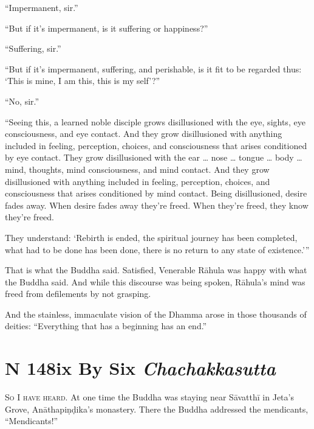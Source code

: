 \documentclass[12pt,openany]{book}%
\newcommand*{\suttatitleacronym}[1]{\smaller[2]{#1}\vspace*{.3em}}
\newcommand*{\suttatitletranslation}[1]{\linebreak{#1}}
\newcommand*{\suttatitleroot}[1]{\linebreak\smaller[2]\itshape{#1}}
\newcommand*{\tocacronym}[1]{\hspace*{-3.3em}{#1}\quad}
\newcommand*{\toctranslation}[1]{#1}
\newcommand*{\tocroot}[1]{(\textit{#1})}
\newcommand*{\scevam}[1]{\textsc{#1}}
\begin{document}
“Impermanent, sir.” 

“But if it’s impermanent, is it suffering or happiness?” 

“Suffering, sir.” 

“But if it’s impermanent, suffering, and perishable, is it fit to be regarded thus: ‘This is mine, I am this, this is my self’?” 

“No, sir.” 

“Seeing this, a learned noble disciple grows disillusioned with the eye, sights, eye consciousness, and eye contact. And they grow disillusioned with anything included in feeling, perception, choices, and consciousness that arises conditioned by eye contact. They grow disillusioned with the ear … nose … tongue … body … mind, thoughts, mind consciousness, and mind contact. And they grow disillusioned with anything included in feeling, perception, choices, and consciousness that arises conditioned by mind contact. Being disillusioned, desire fades away. When desire fades away they’re freed. When they’re freed, they know they’re freed. 

They understand: ‘Rebirth is ended, the spiritual journey has been completed, what had to be done has been done, there is no return to any state of existence.’” 

That is what the Buddha said. Satisfied, Venerable \textsanskrit{Rāhula} was happy with what the Buddha said. And while this discourse was being spoken, \textsanskrit{Rāhula}’s mind was freed from defilements by not grasping. 

And the stainless, immaculate vision of the Dhamma arose in those thousands of deities: “Everything that has a beginning has an end.” 

%
\section*{{\suttatitleacronym MN 148}{\suttatitletranslation Six By Six }{\suttatitleroot Chachakkasutta}}
\addcontentsline{toc}{section}{\tocacronym{MN 148} \toctranslation{Six By Six } \tocroot{Chachakkasutta}}

\scevam{So I have heard. }At one time the Buddha was staying near \textsanskrit{Sāvatthī} in Jeta’s Grove, \textsanskrit{Anāthapiṇḍika}’s monastery. There the Buddha addressed the mendicants, “Mendicants!” 
\end{document}
